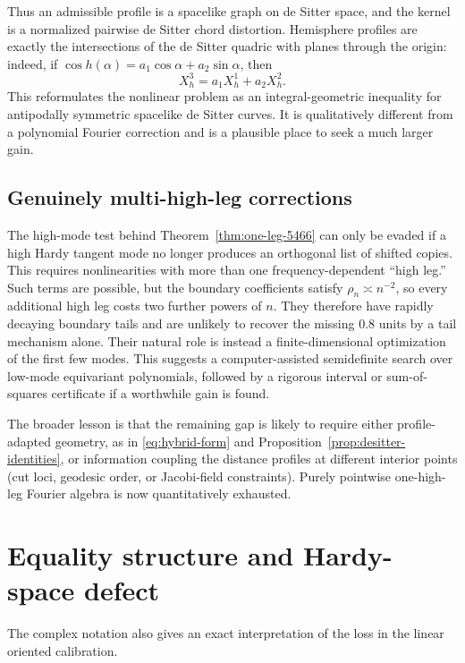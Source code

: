 \documentclass[11pt]{article}
\begin{document}
Thus an admissible profile is a spacelike graph on de Sitter space, and the
kernel is a normalized pairwise de Sitter chord distortion.  Hemisphere profiles
are exactly the intersections of the de Sitter quadric with planes through the
origin: indeed, if $\cos h(\alpha)=a_1\cos\alpha+a_2\sin\alpha$, then
\[
        X_h^3=a_1X_h^1+a_2X_h^2.
\]
This reformulates the nonlinear problem as an integral-geometric inequality for
antipodally symmetric spacelike de Sitter curves.  It is qualitatively different
from a polynomial Fourier correction and is a plausible place to seek a much
larger gain.

\subsection{Genuinely multi-high-leg corrections}

The high-mode test behind Theorem~\ref{thm:one-leg-5466} can only be evaded if a
high Hardy tangent mode no longer produces an orthogonal list of shifted copies.
This requires nonlinearities with more than one frequency-dependent ``high leg.''
Such terms are possible, but the boundary coefficients satisfy
$\rho_n\asymp n^{-2}$, so every additional high leg costs two further powers of
$n$.  They therefore have rapidly decaying boundary tails and are unlikely to
recover the missing $0.8$ units by a tail mechanism alone.  Their natural role is
instead a finite-dimensional optimization of the first few modes.  This suggests a
computer-assisted semidefinite search over low-mode equivariant polynomials,
followed by a rigorous interval or sum-of-squares certificate if a worthwhile gain
is found.

The broader lesson is that the remaining gap is likely to require either
profile-adapted geometry, as in \eqref{eq:hybrid-form} and
Proposition~\ref{prop:desitter-identities}, or information coupling the distance
profiles at different interior points (cut loci, geodesic order, or Jacobi-field
constraints).  Purely pointwise one-high-leg Fourier algebra is now quantitatively
exhausted.

\section{Equality structure and Hardy-space defect}

The complex notation also gives an exact interpretation of the loss in the
linear oriented calibration.
\end{document}
